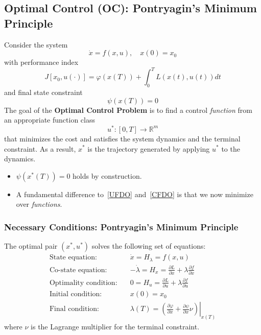 \subsection{Optimal Control (OC): Pontryagin's Minimum Principle}

Consider the system
\begin{equation*}
    \dot{x} = f(x, u), \quad x(0) = x_0
\end{equation*}
with performance index
\begin{equation*}
    J[x_0, u(\cdot)] = \varphi(x(T)) + \int_0^T L(x(t), u(t)) dt
\end{equation*}
and final state constraint
\begin{equation*}
    \psi(x(T)) = 0
\end{equation*}
\newpar{}
The goal of the \textbf{Optimal Control Problem} is to find a control \textit{function} from an appropriate function class
\begin{equation*}
    u^* : [0, T] \to \mathbb{R}^m
\end{equation*}
that minimizes the cost and satisfies the system dynamics and the terminal constraint.
\newpar{}
As a result, $x^*$ is the trajectory generated by applying $u^*$ to the dynamics.
\newpar{}

\begin{itemize}
    \item $\psi(x^*(T)) = 0$ holds by construction.
    \item A fundamental difference to~\ref{UFDO} and~\ref{CFDO} is that we now minimize over \textit{functions}.
\end{itemize}

\subsubsection{Necessary Conditions: Pontryagin's Minimum Principle}
The optimal pair $(x^*, u^*)$ solves the following set of equations:
\begin{align*}
    \text{State equation:} \quad       & \dot{x} = H_\lambda = f(x, u)                                                                                                \\
    \text{Co-state equation:} \quad    & -\dot{\lambda} = H_x = \frac{\partial L}{\partial x} + \lambda \frac{\partial f}{\partial x}                                 \\
    \text{Optimality condition:} \quad & 0 = H_u = \frac{\partial L}{\partial u} + \lambda \frac{\partial f}{\partial u}                                              \\
    \text{Initial condition:} \quad    & x(0) = x_0                                                                                                                   \\
    \text{Final condition:} \quad      & \lambda(T) = \left. \left( \frac{\partial \varphi}{\partial x} + \frac{\partial \psi}{\partial x} \nu \right) \right|_{x(T)}
\end{align*}
where $\nu$ is the Lagrange multiplier for the terminal constraint.

